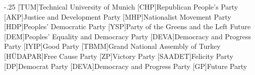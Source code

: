 \documentclass[headsepline,footsepline,footinclude=false,oneside,fontsize=11pt,paper=a4,listof=totoc,bibliography=totoc]{scrbook} %
\begin{document}


\frontmatter{}





\tableofcontents{}

\mainmatter{}


% 







\appendix{}


\begin{acronym}
	\itemsep-.25\baselineskip
	[TUM]{Technical University of Munich}
	[CHP]{Republican People's Party}
	[AKP]{Justice and Development Party}
	[MHP]{Nationalist Movement Party}
	[HDP]{Peoples' Democratic Party}
	[YSP]{Party of the Greens and the Left Future}
	[DEM]{Peoples' Equality and Democracy Party}
	[DEVA]{Democracy and Progress Party}
	[IYIP]{Good Party}
	[TBMM]{Grand National Assembly of Turkey}
	[HÜDAPAR]{Free Cause Party}
	[ZP]{Victory Party}
	[SAADET]{Felicity Party}
	[DP]{Democrat Party}
	[DEVA]{Democracy and Progress Party}
	[GP]{Future Party}
\end{acronym}

\listoffigures{}
\listoftables{}
\printbibliography{}
\end{document}
